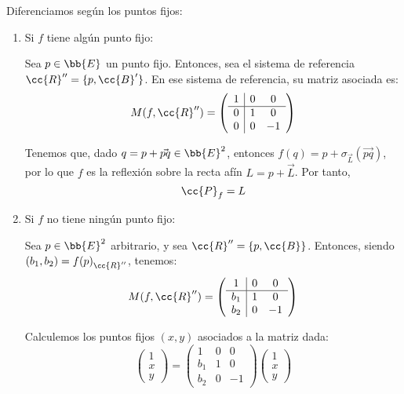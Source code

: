 Diferenciamos según los puntos fijos:
\begin{enumerate}
    \item Si $f$ tiene algún punto fijo:

    Sea $p\in \bb{E}$ un punto fijo. Entonces, sea el sistema de referencia $\cc{R}''= \{p, \cc{B}'\}$. En ese sistema de referencia, su matriz asociada es:
    \begin{equation*}
        M(f,\cc{R}'') = \left(\begin{array}{c|cc}
            1 & 0 & 0 \\ \hline
            0 & 1 & 0 \\ 
            0 & 0 & -1
        \end{array}\right)
    \end{equation*}

    Tenemos que, dado $q=p+\vec{pq}\in \bb{E}^2$, entonces $f(q)=p+\sigma_{\vec{L}}(\vec{pq})$, por lo que $f$ es la reflexión sobre la recta afín $L=p+\vec{L}$. Por tanto,
    \begin{equation*}
        \cc{P}_f = L
    \end{equation*}

    \item Si $f$ no tiene ningún punto fijo:

    Sea $p\in \bb{E}^2$ arbitrario, y sea $\cc{R}''=\{p, \cc{B}\}$. Entonces, siendo $(b_1,b_2)={f(p)}_{\cc{R}''}$, tenemos:
    \begin{equation*}
        M(f,\cc{R}'') = \left(\begin{array}{c|cc}
            1 & 0 & 0 \\ \hline
            b_1 & 1 & 0 \\ 
            b_2 & 0 & -1
        \end{array}\right)
    \end{equation*}

    Calculemos los puntos fijos $(x,y)$ asociados a la matriz dada:
    \begin{equation*}
        \left(\begin{array}{c}
            1 \\ \hline x \\ y
        \end{array}\right)
        = \left(\begin{array}{c|cc}
            1 & 0 & 0 \\ \hline
            b_1 & 1 & 0 \\ 
            b_2 & 0 & -1
        \end{array}\right)
        \left(\begin{array}{c}
            1 \\ \hline x \\ y
        \end{array}\right)
    \end{equation*}


\end{enumerate}
